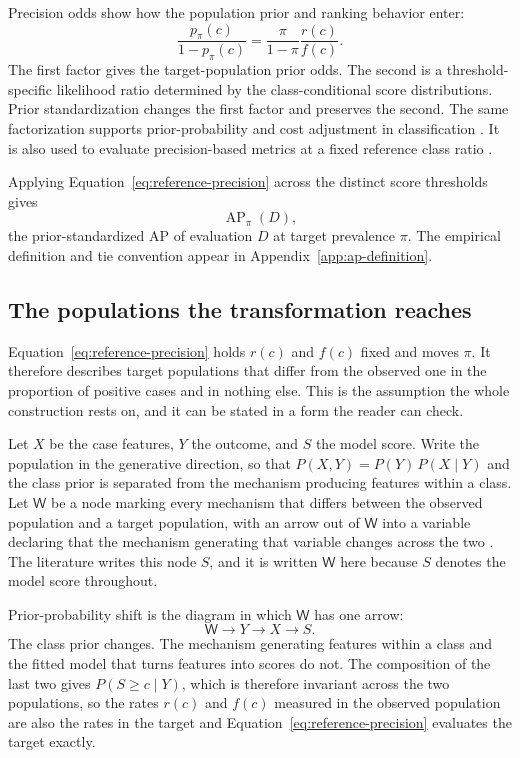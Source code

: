 \documentclass[11pt]{article}
\newcommand{\AP}{\operatorname{AP}}
\newcommand{\Sel}{\mathsf{W}}
\theoremstyle{remark}
\begin{document}
Precision odds show how the population prior and ranking behavior enter:
\begin{equation}
\frac{p_\pi(c)}{1-p_\pi(c)}
=
\frac{\pi}{1-\pi}
\frac{r(c)}{f(c)}.
\label{eq:precision-odds}
\end{equation}
The first factor gives the target-population prior odds. The second is a threshold-specific likelihood ratio determined by the class-conditional score distributions. Prior standardization changes the first factor and preserves the second. The same factorization supports prior-probability and cost adjustment in classification \cite{elkan2001foundations}. It is also used to evaluate precision-based metrics at a fixed reference class ratio \cite{siblini2020calibration,degeest2016online}.

Applying Equation~\eqref{eq:reference-precision} across the distinct score thresholds gives
\[
\AP_\pi(D),
\]
the prior-standardized AP of evaluation $D$ at target prevalence $\pi$. The empirical definition and tie convention appear in Appendix~\ref{app:ap-definition}.

\subsection{The populations the transformation reaches}
\label{sec:transport}

Equation~\eqref{eq:reference-precision} holds $r(c)$ and $f(c)$ fixed and moves $\pi$. It therefore describes target populations that differ from the observed one in the proportion of positive cases and in nothing else. This is the assumption the whole construction rests on, and it can be stated in a form the reader can check.

Let $X$ be the case features, $Y$ the outcome, and $S$ the model score. Write the population in the generative direction, so that $P(X,Y)=P(Y)\,P(X\mid Y)$ and the class prior is separated from the mechanism producing features within a class. Let $\Sel$ be a node marking every mechanism that differs between the observed population and a target population, with an arrow out of $\Sel$ into a variable declaring that the mechanism generating that variable changes across the two \cite{pearl2011transportability,bareinboim2013transportability}. The literature writes this node $S$, and it is written $\Sel$ here because $S$ denotes the model score throughout.

Prior-probability shift is the diagram in which $\Sel$ has one arrow:
\begin{equation}
\Sel\longrightarrow Y\longrightarrow X\longrightarrow S .
\label{eq:selection-diagram}
\end{equation}
The class prior changes. The mechanism generating features within a class and the fitted model that turns features into scores do not. The composition of the last two gives $P(S\geq c\mid Y)$, which is therefore invariant across the two populations, so the rates $r(c)$ and $f(c)$ measured in the observed population are also the rates in the target and Equation~\eqref{eq:reference-precision} evaluates the target exactly.
\end{document}
